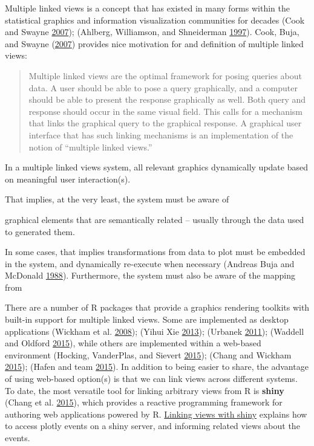 \documentclass[12pt,]{isuthesis}
\begin{document}
Multiple linked views is a concept that has existed in many forms within
the statistical graphics and information visualization communities for
decades (Cook and Swayne \protect\hyperlink{ref-ggobi:2007}{2007});
(Ahlberg, Williamson, and Shneiderman
\protect\hyperlink{ref-Ahlberg:1997tb}{1997}). Cook, Buja, and Swayne
(\protect\hyperlink{ref-Cook:2007uk}{2007}) provides nice motivation for
and definition of multiple linked views:

\begin{quote}
Multiple linked views are the optimal framework for posing queries about
data. A user should be able to pose a query graphically, and a computer
should be able to present the response graphically as well. Both query
and response should occur in the same visual field. This calls for a
mechanism that links the graphical query to the graphical response. A
graphical user interface that has such linking mechanisms is an
implementation of the notion of ``multiple linked views.''
\end{quote}

In a multiple linked views system, all relevant graphics dynamically
update based on meaningful user interaction(s).

That implies, at the very least, the system must be aware of

graphical elements that are semantically related -- usually through the
data used to generated them.

In some cases, that implies transformations from data to plot must be
embedded in the system, and dynamically re-execute when necessary
(Andreas Buja and McDonald
\protect\hyperlink{ref-viewing-pipeline}{1988}). Furthermore, the system
must also be aware of the mapping from

There are a number of R packages that provide a graphics rendering
toolkits with built-in support for multiple linked views. Some are
implemented as desktop applications (Wickham et al.
\protect\hyperlink{ref-rggobi}{2008}); (Yihui Xie
\protect\hyperlink{ref-cranvas}{2013}); (Urbanek
\protect\hyperlink{ref-iPlots}{2011}); (Waddell and Oldford
\protect\hyperlink{ref-loon}{2015}), while others are implemented within
a web-based environment (Hocking, VanderPlas, and Sievert
\protect\hyperlink{ref-animint}{2015}); (Chang and Wickham
\protect\hyperlink{ref-ggvis}{2015}); (Hafen and team
\protect\hyperlink{ref-rbokeh}{2015}). In addition to being easier to
share, the advantage of using web-based option(s) is that we can link
views across different systems. To date, the most versatile tool for
linking arbitrary views from R is \textbf{shiny} (Chang et al.
\protect\hyperlink{ref-shiny}{2015}), which provides a reactive
programming framework for authoring web applications powered by R.
\protect\hyperlink{linking-views-with-shiny}{Linking views with shiny}
explains how to access plotly events on a shiny server, and informing
related views about the events.
\end{document}
